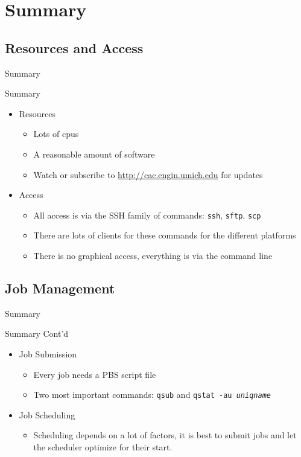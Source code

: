 \documentclass{beamer}
\begin{document}
\section{Summary}
\subsection{Resources and Access}
\begin{frame}{Summary}
 \begin{block}{Summary}
 \begin{itemize}
  \item Resources
   \begin{itemize}
    \item Lots of cpus
    \item A reasonable amount of software
    \item Watch or subscribe to \url{http://cac.engin.umich.edu} for updates
   \end{itemize}
   \item Access
    \begin{itemize}
     \item All access is via the SSH family of commands: \texttt{ssh},
\texttt{sftp}, \texttt{scp}
     \item There are lots of clients for these commands for the different
platforms
     \item There is no graphical access, everything is via the command line
    \end{itemize}
 \end{itemize}
 \end{block}
\end{frame}
\subsection{Job Management}
\begin{frame}{Summary}
 \begin{block}{Summary Cont'd}
 \begin{itemize}
   \item Job Submission
     \begin{itemize}
     \item Every job needs a PBS script file
     \item Two most important commands: \texttt{qsub} and \texttt{qstat -au \textit{uniqname}}
     \end{itemize}
   \item Job Scheduling
     \begin{itemize}
     \item Scheduling depends on a lot of factors, it is best to submit jobs and let the
scheduler optimize for their start.
     \end{itemize}
 \end{itemize}
 \end{block}
\end{frame}
\end{document}
